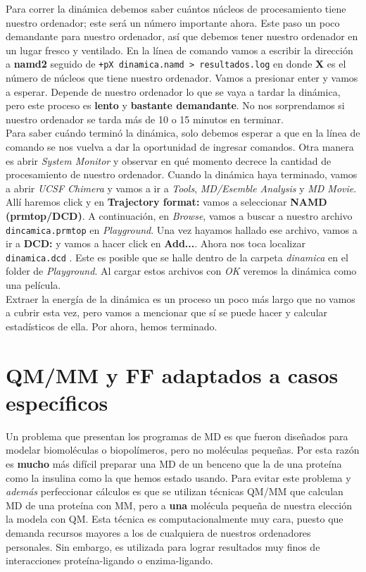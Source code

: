 \documentclass[10pt,letterpaper]{article}
\newcommand{\inlinecode}[1]{
\colorbox{light-gray}{\texttt{#1}}
}
\begin{document}
Para correr la din\'amica debemos saber cu\'antos n\'ucleos de procesamiento tiene nuestro ordenador; este ser\'a un n\'umero importante ahora. Este paso un poco demandante para nuestro ordenador, as\'i que debemos tener nuestro ordenador en un lugar fresco y ventilado. En la l\'inea de comando vamos a escribir la direcci\'on a \textbf{namd2} seguido de \inlinecode{+pX dinamica.namd >\ resultados.log} en donde \textbf{X} es el n\'umero de n\'ucleos que tiene nuestro ordenador. Vamos a presionar enter y vamos a esperar. Depende de nuestro ordenador lo que se vaya a tardar la din\'amica, pero este proceso es \textbf{lento} y \textbf{bastante demandante}. No nos sorprendamos si nuestro ordenador se tarda m\'as de 10 o 15 minutos en terminar.\\

Para saber cu\'ando termin\'o la din\'amica, solo debemos esperar a que en la l\'inea de comando se nos vuelva a dar la oportunidad de ingresar comandos. Otra manera es abrir \textit{System Monitor} y observar en qu\'e momento decrece la cantidad de procesamiento de nuestro ordenador. Cuando la din\'amica haya terminado, vamos a abrir \textit{UCSF Chimera} y vamos a ir a \textit{Tools}, \textit{MD/Esemble Analysis} y \textit{MD Movie}. All\'i haremos click y en \textbf{Trajectory format:} vamos a seleccionar \textbf{NAMD (prmtop/DCD)}. A continuaci\'on, en \textit{Browse}, vamos a buscar a nuestro archivo \inlinecode{dincamica.prmtop} en \textit{Playground}. Una vez hayamos hallado ese archivo, vamos a ir a \textbf{DCD:} y vamos a hacer click en \textbf{Add...}. Ahora nos toca localizar \inlinecode{dinamica.dcd}. Este es posible que se halle dentro de la carpeta \textit{dinamica} en el folder de \textit{Playground}. Al cargar estos archivos con \textit{OK} veremos la din\'amica como una pel\'icula.\\

Extraer la energ\'ia de la din\'amica es un proceso un poco m\'as largo que no vamos a cubrir esta vez, pero vamos a mencionar que s\'i se puede hacer y calcular estad\'isticos de ella. Por ahora, hemos terminado.

\section{QM/MM y FF adaptados a casos espec\'ificos}
Un problema que presentan los programas de MD es que fueron dise\~nados para modelar biomol\'eculas o biopol\'imeros, pero no mol\'eculas peque\~nas. Por esta raz\'on es \textbf{mucho} m\'as dif\'icil preparar una MD de un benceno que la de una prote\'ina como la insulina como la que hemos estado usando. Para evitar este problema y \emph{adem\'as} perfeccionar c\'alculos es que se utilizan t\'ecnicas QM/MM que calculan MD de una prote\'ina con MM, pero a \textbf{una} mol\'ecula peque\~na de nuestra elecci\'on la modela con QM. Esta t\'ecnica es computacionalmente muy cara, puesto que demanda recursos mayores a los de cualquiera de nuestros ordenadores personales. Sin embargo, es utilizada para lograr resultados muy finos de interacciones prote\'ina-ligando o enzima-ligando.\\
\end{document}
